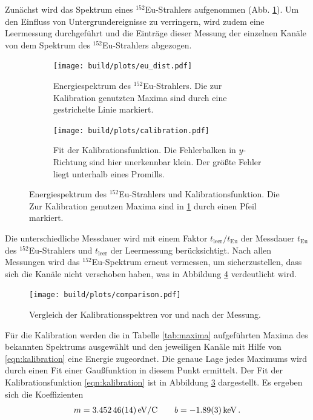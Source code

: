 Zunächst wird das Spektrum eines $^{152}$Eu-Strahlers aufgenommen (Abb.
\ref{fig:eu_uncalibrated}).
Um den Einfluss von Untergrundereignisse zu verringern, wird zudem eine
Leermessung durchgeführt und die Einträge dieser Messung der einzelnen Kanäle
von dem Spektrum des $^{152}$Eu-Strahlers abgezogen.
\begin{figure}[htb]
    \centering
    \begin{subfigure}[t]{.49\linewidth}
        \texttt{[image: build/plots/eu\_dist.pdf]}
        \caption{
            Energiespektrum des $^{152}$Eu-Strahlers. Die zur Kalibration
            genutzten Maxima sind durch eine gestrichelte Linie markiert.
        }
        \label{fig:eu_uncalibrated}
    \end{subfigure}%
    \begin{subfigure}[t]{.49\linewidth}
        \texttt{[image: build/plots/calibration.pdf]}
        \caption{
            Fit der Kalibrationsfunktion. Die Fehlerbalken in $y$-Richtung
            sind hier unerkennbar klein. Der größte Fehler liegt
            unterhalb eines Promills.
        }
        \label{fig:calibration}
    \end{subfigure}
    \caption{
        Energiespektrum des $^{152}$Eu-Strahlers und Kalibrationsfunktion.
        Die Zur Kalibration genutzen Maxima sind in \ref{fig:eu_uncalibrated}
        durch einen Pfeil markiert.
    }
\end{figure}
Die unterschiedliche Messdauer wird mit einem Faktor $t_\text{leer} / t_\text{Eu}$
der Messdauer $t_\text{Eu}$ des $^{152}$Eu-Strahlers und $t_\text{leer}$ der
Leermessung berücksichtigt.
Nach allen Messungen wird das $^{152}$Eu-Spektrum erneut vermessen,
um sicherzustellen, dass sich die Kanäle nicht verschoben haben, was in Abbildung
\ref{fig:control} verdeutlicht wird.
\begin{figure}
    \centering
    \texttt{[image: build/plots/comparison.pdf]}
    \caption{
        Vergleich der Kalibrationsspektren vor und nach der Messung.
    }
    \label{fig:control}
\end{figure}
Für die Kalibration werden die in Tabelle \ref{tab:maxima} aufgeführten
Maxima des bekannten Spektrums ausgewählt und den jeweiligen Kanäle mit
Hilfe von \eqref{eqn:kalibration} eine Energie zugeordnet.
Die genaue Lage jedes Maximums wird durch einen Fit einer Gaußfunktion in diesem
Punkt ermittelt.
Der Fit der Kalibrationsfunktion \eqref{eqn:kalibration} ist in Abbildung \ref{fig:calibration}
dargestellt. Es ergeben sich die Koeffizienten
%
\begin{align*}
    m = \SI{3.45246+-0.00014}{eV/C} \qquad b = \SI{-1.89+-0.03}{keV} \,.
\end{align*}
